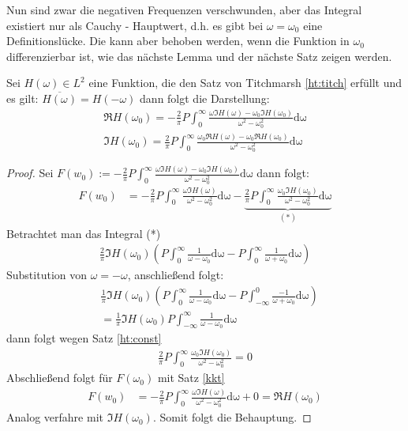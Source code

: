 Nun sind zwar die negativen Frequenzen verschwunden, aber das Integral existiert nur als Cauchy - Hauptwert, d.h. es gibt bei $\omega = \omega_0$ eine Definitionslücke. Die kann aber behoben werden, wenn die Funktion in $\omega_0$ differenzierbar ist, wie das nächste Lemma und der nächste Satz zeigen werden. 
\begin{lemma}\label{kkt:alternative}
Sei $H(\omega) \in L^2$ eine Funktion, die den Satz von Titchmarsh \ref{ht:titch} erfüllt und es gilt: $\overline{H(\omega)} = H(-\omega)$ dann folgt die Darstellung:
\begin{align}
	\Re{H(\omega_0)} = -\frac{2}{\pi} P \int_0^{\infty} \frac{\omega \Im{H(\omega)}-\omega_0 \Im{H(\omega_0)}}{\omega^2 - \omega^2_0} \mathrm{d\omega}\\
	\Im{H(\omega_0)} = \frac{2}{\pi} P \int_0^{\infty} \frac{\omega_0 \Re{H(\omega)} - \omega_0 \Re{H(\omega_0)}}{\omega^2 - \omega^2_0} \mathrm{d\omega}
\end{align}
\begin{proof}
Sei $F(w_0):= -\frac{2}{\pi} P \int_0^{\infty} \frac{\omega \Im{H(\omega)}-\omega_0 \Im{H(\omega_0)}}{\omega^2 - \omega^2_0} \mathrm{d\omega}$ dann folgt:
\begin{align}
F(w_0) &= -\frac{2}{\pi} P \int_0^{\infty} \frac{\omega \Im{H(\omega)}}{\omega^2 - \omega^2_0} \mathrm{d\omega} -\underbrace{\frac{2}{\pi} P \int_0^{\infty} \frac{\omega_0 \Im{H(\omega_0)}}{\omega^2 - \omega^2_0} \mathrm{d\omega}}_{(*)}
\end{align}
Betrachtet man das Integral (*)
\begin{align}
\frac{2}{\pi} \Im{H(\omega_0)} \left( P \int_0^{\infty} \frac{1}{\omega - \omega_0} \mathrm{d\omega} - P \int_0^{\infty} \frac{1}{\omega + \omega_0} \mathrm{d\omega} \right)
\end{align}
Substitution von $\omega = -\omega$, anschließend folgt:
\begin{align}
&\frac{1}{\pi} \Im{H(\omega_0)} \left( P \int_0^{\infty} \frac{1}{\omega - \omega_0} \mathrm{d\omega} - P \int_{-\infty}^0 \frac{-1}{\omega + \omega_0} \mathrm{d\omega} \right) \\
&= \frac{1}{\pi} \Im{H(\omega_0)} P \int_{-\infty}^{\infty} \frac{1}{\omega - \omega_0} \mathrm{d\omega} 
\end{align}
dann folgt wegen Satz \ref{ht:const}
\begin{align}
\frac{2}{\pi} P \int_0^{\infty} \frac{\omega_0 \Im{H(\omega_0)}}{\omega^2 - \omega^2_0} = 0
\end{align}
Abschließend folgt für $F(\omega_0)$ mit Satz \ref{kkt}
\begin{align}
F(w_0) &= -\frac{2}{\pi} P \int_0^{\infty} \frac{\omega \Im{H(\omega)}}{\omega^2 - \omega^2_0} \mathrm{d\omega} + 0 = \Re{H(\omega_0)}
\end{align}
Analog verfahre mit $\Im{H(\omega_0)}$. Somit folgt die Behauptung.
\end{proof}
\end{lemma}
